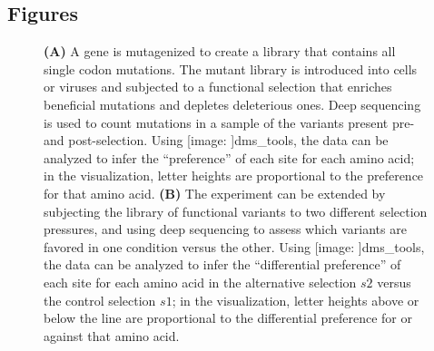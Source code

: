 \documentclass[twocolumn]{bmcart}%
\def\texttt{[image: ]}
\begin{document}
\begin{backmatter}


\clearpage
\onecolumn

\section*{Figures}

\begin{figure}[h!]
\caption{\label{fig:DeepMutationalScan}{ {\bf (A)} A gene is mutagenized to create a library that contains all single codon mutations. The mutant library is introduced into cells or viruses and subjected to a functional selection that enriches beneficial mutations and depletes deleterious ones. Deep sequencing is used to count mutations in a sample of the variants present pre- and post-selection. Using \texttt{dms\_tools}, the data can be analyzed to infer the ``preference'' of each site for each amino acid; in the visualization, letter heights are proportional to the preference for that amino acid. {\bf (B)} The experiment can be extended by subjecting the library of functional variants to two different selection pressures, and using deep sequencing to assess which variants are favored in one condition versus the other. Using \texttt{dms\_tools}, the data can be analyzed to infer the ``differential preference'' of each site for each amino acid in the alternative selection $s2$ versus the control selection $s1$; in the visualization, letter heights above or below the line are proportional to the differential preference for or against that amino acid.}}
\end{figure}


\end{backmatter}
\end{document}
